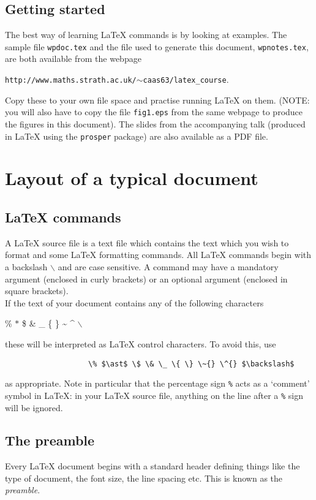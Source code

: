 \documentclass[11pt,a4]{article}
\newcommand{\bc}{\begin{center}}
\newcommand{\ec}{\end{center}}
\newcommand{\lx}{{\LaTeX} }
\begin{document}
\subsection{Getting started}
The best way of learning \lx commands is by looking at examples.
The sample file \texttt{wpdoc.tex} and the file used to generate
this document, \texttt{wpnotes.tex}, are both available from the webpage 
\bc
\texttt{http://www.maths.strath.ac.uk/$\sim$caas63/latex\_course}. 
\ec
Copy these to your own file space and
practise running \lx on them. (NOTE: you will also have to copy
the file \texttt{fig1.eps} from the same webpage to produce the figures in
this document). The slides from the accompanying talk (produced in
\lx using the \texttt{prosper} package) are also available as a PDF
file.


\section{Layout of a typical document}

\subsection{ \lx commands}

A \lx source file is a text file which contains the text which you
wish to format and some \lx formatting commands. All \lx commands
begin with a backslash $\backslash$ and are case sensitive. A
command may have a mandatory argument (enclosed in curly brackets)
or an optional argument (enclosed in square brackets).\\

If the text of your document contains any of the following
characters
\bc
\% $\ast$ \$ \& \_ \{ \} \~{} \^{} $\backslash$
\ec
these will be interpreted as \lx control characters. To avoid
this, use

\begin{verbatim}
                   \% $\ast$ \$ \& \_ \{ \} \~{} \^{} $\backslash$
\end{verbatim}
as appropriate.
Note in particular that the percentage sign \verb+%+ acts as a
`comment' symbol in \LaTeX: in your \lx source file, anything on the line 
after a \verb+%+ sign will be ignored.

\subsection{The preamble}

Every \lx document begins with a standard header defining things
like the type of document, the font size, the line spacing etc.
This is known as the \textit{preamble}.\\
\end{document}
